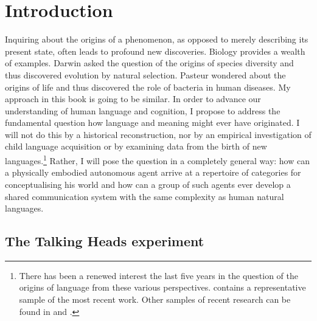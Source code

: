 \chapter{Introduction}
\label{c:introduction}
\setcounter{foot}{1}
Inquiring about the origins of a phenomenon, 
as opposed to merely describing its present state, often 
leads to profound new discoveries. Biology provides a 
wealth of examples. 
Darwin asked the question of the origins of species diversity and 
thus discovered evolution by natural selection. Pasteur
wondered about the origins of life and thus
discovered the role of bacteria in 
human diseases. My approach in this book is going to 
be similar. In order to advance our understanding 
of human language and cognition, I propose to address
the fundamental question how language 
and meaning might ever have originated. I will not do 
this by a historical reconstruction, nor by an 
empirical investigation of child language acquisition or 
by examining data from the birth of new
languages.\footnote{
There has been a renewed interest the last five
years in the 
question of the origins of language from these various 
perspectives. \cite{Hurford:1998} contains 
a representative sample of the most recent work. 
Other samples of recent research 
can be found in \cite{Hawkins:1992} and \cite{Velichkovsky:1996}. 
}
Rather, 
I will pose the question in a completely general way: 
how can a physically embodied autonomous agent  arrive 
at a repertoire of categories for conceptualising his
world and how can a group of such agents ever develop 
a shared communication system with the same complexity 
as human natural languages. 

\section{The Talking Heads experiment}

